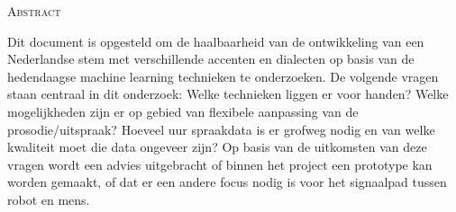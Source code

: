 \begin{center}
  \textsc{Abstract}
\end{center}
%
\noindent
%
Dit document is opgesteld om de haalbaarheid van de ontwikkeling van een Nederlandse stem met verschillende accenten en dialecten op basis van de hedendaagse machine learning technieken te onderzoeken. De volgende vragen staan centraal in dit onderzoek: Welke technieken liggen er voor handen? Welke mogelijkheden zijn er op gebied van flexibele aanpassing van de prosodie/uitspraak? Hoeveel uur spraakdata is er grofweg nodig en van welke kwaliteit moet die data ongeveer zijn? Op basis van de uitkomsten van deze vragen wordt een advies uitgebracht of binnen het project een prototype kan worden gemaakt, of dat er een andere focus nodig is voor het signaalpad tussen robot en mens.
